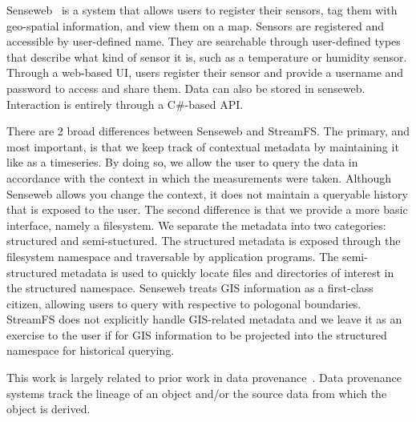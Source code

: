 Senseweb~\cite{senseweb} is a system that allows users to register their sensors, tag them with geo-spatial information,
and view them on a map.  Sensors are registered and accessible by user-defined name.  They are searchable through user-defined
types that describe what kind of sensor it is, such as a temperature or humidity sensor.  Through a web-based UI, 
users register their sensor and provide a username and password to access and share them.  Data can also be stored
in senseweb.  Interaction is entirely through a C\#-based API.

There are 2 broad differences between Senseweb and StreamFS.  The primary, and most important, is that we keep track of 
contextual metadata by maintaining it like as a timeseries.  By doing so, we allow the user to query the data in accordance
with the context in which the measurements were taken.  Although Senseweb allows you change the context, it does not 
maintain a queryable history that is exposed to the user.  The second difference is that we provide a more basic 
interface, namely a filesystem.  We separate the metadata into two categories: structured and semi-stuctured.  The 
structured metadata is exposed through the filesystem namespace and traversable by application programs.
The semi-structured metadata is used to quickly locate files and directories of interest in the structured namespace.
Senseweb treats GIS information as a first-class citizen, allowing users to query with respective to pologonal 
boundaries.  StreamFS does not explicitly handle GIS-related metadata and we leave it as an exercise to the user
if for GIS information to be projected into the structured namespace for historical querying.

This work is largely related to prior work in data provenance~\cite{dataprovtax}.  Data provenance systems track
the lineage of an object and/or the source data from which the object is derived.



